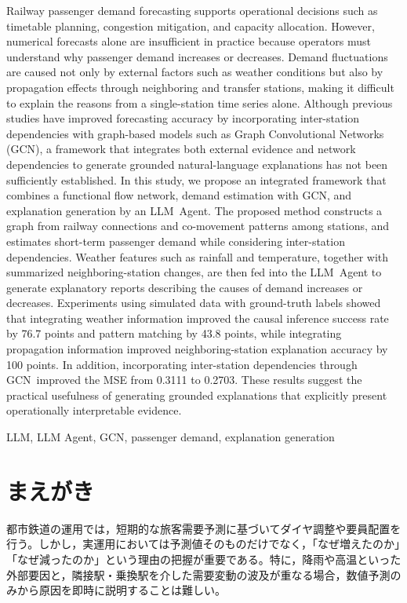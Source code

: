\documentclass[technicalreport]{ieicej}
\newcommand{\LLM}{LLM}
\newcommand{\GCN}{GCN}
\begin{document}
\begin{eabstract}
Railway passenger demand forecasting supports operational decisions such as timetable planning, congestion mitigation, and capacity allocation. However, numerical forecasts alone are insufficient in practice because operators must understand why passenger demand increases or decreases. Demand fluctuations are caused not only by external factors such as weather conditions but also by propagation effects through neighboring and transfer stations, making it difficult to explain the reasons from a single-station time series alone. Although previous studies have improved forecasting accuracy by incorporating inter-station dependencies with graph-based models such as Graph Convolutional Networks (\GCN), a framework that integrates both external evidence and network dependencies to generate grounded natural-language explanations has not been sufficiently established. In this study, we propose an integrated framework that combines a functional flow network, demand estimation with \GCN, and explanation generation by an \LLM\ Agent. The proposed method constructs a graph from railway connections and co-movement patterns among stations, and estimates short-term passenger demand while considering inter-station dependencies. Weather features such as rainfall and temperature, together with summarized neighboring-station changes, are then fed into the \LLM\ Agent to generate explanatory reports describing the causes of demand increases or decreases. Experiments using simulated data with ground-truth labels showed that integrating weather information improved the causal inference success rate by 76.7 points and pattern matching by 43.8 points, while integrating propagation information improved neighboring-station explanation accuracy by 100 points. In addition, incorporating inter-station dependencies through \GCN\ improved the MSE from 0.3111 to 0.2703. These results suggest the practical usefulness of generating grounded explanations that explicitly present operationally interpretable evidence.
\end{eabstract}

\begin{ekeyword}
LLM, LLM Agent, GCN, passenger demand, explanation generation
\end{ekeyword}

\maketitle

\section{まえがき}
都市鉄道の運用では，短期的な旅客需要予測に基づいてダイヤ調整や要員配置を行う。しかし，実運用においては予測値そのものだけでなく，「なぜ増えたのか」「なぜ減ったのか」という理由の把握が重要である。特に，降雨や高温といった外部要因と，隣接駅・乗換駅を介した需要変動の波及が重なる場合，数値予測のみから原因を即時に説明することは難しい。
\end{document}
